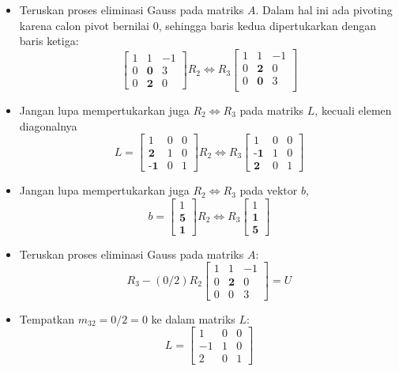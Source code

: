 \documentclass[pdflatex,compress,mathserif]{beamer}
\begin{document}
\begin{frame}
	\begin{itemize}
		\item Teruskan proses eliminasi Gauss pada matriks $ A $. Dalam hal ini ada pivoting karena calon pivot bernilai $ 0 $, sehingga baris kedua dipertukarkan dengan baris ketiga:
		\[ \begin{bmatrix}
			1 & 1 & -1 \\
			0 & \textbf{0} & 3 \\
			0 & \textbf{2} & 0
		\end{bmatrix} R_2 \Leftrightarrow R_3
		\begin{bmatrix}
			1 & 1 & -1 \\
			0 & \textbf{2} & 0 \\
			0 & \textbf{0} & 3 \\
		\end{bmatrix}\]
		\item Jangan lupa mempertukarkan juga $ R_2 \Leftrightarrow R_3 $ pada matriks $ L $, kecuali elemen diagonalnya
		\[
		L = \begin{bmatrix}
			1 & 0 & 0 \\
			\textbf{2} & 1 & 0 \\
			\textbf{-1} & 0 & 1
		\end{bmatrix}
		R_2 \Leftrightarrow R_3
		\begin{bmatrix}
			1 & 0 & 0 \\
			\textbf{-1} & 1 & 0 \\
			\textbf{2} & 0 & 1
		\end{bmatrix}
		\]
	\end{itemize}
\end{frame}

\begin{frame}
	\begin{itemize}
		\item Jangan lupa mempertukarkan juga $ R_2 \Leftrightarrow R_3 $ pada vektor $ b $,
		\[ b = \begin{bmatrix}
		1 \\ \textbf{5} \\ \textbf{1}
		\end{bmatrix} R_2 \Leftrightarrow R_3
		 \begin{bmatrix}
		1 \\ \textbf{1} \\ \textbf{5}
		\end{bmatrix}
		\]
		\item Teruskan proses eliminasi Gauss pada matriks $ A $:
		\[ R_3 - (0/2)R_2 \begin{bmatrix}
			1 & 1 & -1 \\
			0 & \textbf{2} & 0 \\
			0 & 0 & 3
		\end{bmatrix} = U \]
		\item Tempatkan $ m_{32} = 0/2 = 0 $ ke dalam matriks $ L $:
		\[ L = \begin{bmatrix}
			1 & 0 & 0 \\
			-1 & 1 & 0 \\
			2 & 0 & 1
		\end{bmatrix}\]
	\end{itemize}
\end{frame}
\end{document}
